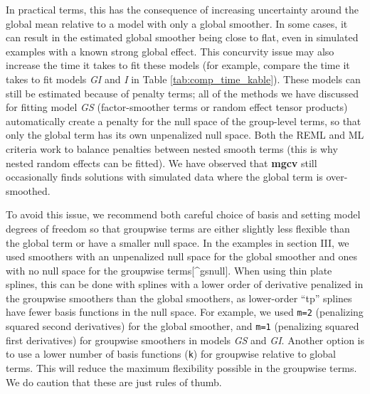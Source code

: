 \documentclass[12pt]{article}
\begin{document}
In practical terms, this has the consequence of increasing uncertainty
around the global mean relative to a model with only a global smoother.
In some cases, it can result in the estimated global smoother being
close to flat, even in simulated examples with a known strong global
effect. This concurvity issue may also increase the time it takes to fit
these models (for example, compare the time it takes to fit models
\emph{GI} and \emph{I} in Table \ref{tab:comp_time_kable}). These models
can still be estimated because of penalty terms; all of the methods we
have discussed for fitting model \emph{GS} (factor-smoother terms or
random effect tensor products) automatically create a penalty for the
null space of the group-level terms, so that only the global term has
its own unpenalized null space. Both the REML and ML criteria work to
balance penalties between nested smooth terms (this is why nested random
effects can be fitted). We have observed that \textbf{mgcv} still
occasionally finds solutions with simulated data where the global term
is over-smoothed.

To avoid this issue, we recommend both careful choice of basis and
setting model degrees of freedom so that groupwise terms are either
slightly less flexible than the global term or have a smaller null
space. In the examples in section III, we used smoothers with an
unpenalized null space for the global smoother and ones with no null
space for the groupwise terms{[}\^{}gsnull{]}. When using thin plate
splines, this can be done with splines with a lower order of derivative
penalized in the groupwise smoothers than the global smoothers, as
lower-order ``tp'' splines have fewer basis functions in the null space.
For example, we used \texttt{m=2} (penalizing squared second
derivatives) for the global smoother, and \texttt{m=1} (penalizing
squared first derivatives) for groupwise smoothers in models \emph{GS}
and \emph{GI}. Another option is to use a lower number of basis
functions (\texttt{k}) for groupwise relative to global terms. This will
reduce the maximum flexibility possible in the groupwise terms. We do
caution that these are just rules of thumb.
\end{document}
